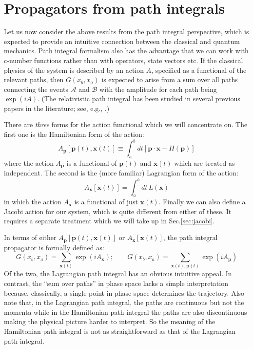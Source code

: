 \documentclass{article}
\begin{document}
 
 \section{Propagators from path integrals}\label{sec:prfrpi}
 
 Let us now consider the above results from the path integral perspective, which is expected to provide an intuitive connection between the classical and quantum mechanics. Path integral formalism also has the advantage that we can work with c-number functions rather than with operators, state vectors etc.  If the classical physics of the system is described by an action $A$, specified as a functional of the relevant paths, then $G(x_b, x_a)$ is expected to arise  from a sum over all paths connecting the events $\mathcal{A}$ and $\mathcal{B}$ with the amplitude for each path being $\exp(iA)$. (The relativistic path integral has been studied in several previous papers in the literature; see, e.g., \cite{A,A1,A2,B,B2,B9,E,H,I}.)
 
 There are \textit{three}  forms for the action functional which we will concentrate on. The first one is the Hamiltonian form of the action:
 \begin{equation}
  A_{\bm{p}}[\bm{p}(t), \bm{x}(t)] \equiv \int_a^b dt [\bm{p \cdot \dot x} - H (\bm{p})]
 \end{equation} 
 where the action $A_{\bm{p}}$ is a functional of  $\bm{p}(t)$ and $\bm{x}(t)$ which are treated as independent. The second is the (more familiar) Lagrangian form of the action:
 \begin{equation}
A_{\bm{x}}[\bm{x}(t)] = \int_a^b dt \, L(\dot{\bm{x}})
\end{equation} 
 in which the action $A_{\bm{x}}$ is a functional of just $\bm{x}(t)$. Finally we can also define a Jacobi action for our system, which is quite different from either of these. It requires a separate treatment which we will take up in Sec.\ref{sec:jacobi}.
  
  In terms of either $A_{\bm{p}}[\bm{p}(t), \bm{x}(t)]$ or $A_{\bm{x}}[\bm{x}(t)]$,  the path integral propagator is formally defined as: 
 \begin{equation} 
G(x_b, x_a) = \sum_{\bm{x}(t)} \exp (iA_{\bm{x}});\qquad  G(x_b, x_a)= \sum_{\bm{x}(t), \bm{p}(t) }\exp(i A_{\bm{p}} )
 \end{equation}
 Of the two, the Lagrangian path integral has an obvious intuitive appeal.  In contrast, the ``sum over paths'' in phase space lacks a simple interpretation  because, classically, a single point in phase space determines the trajectory. Also note that, in the Lagrangian path integral, the paths are continuous but not the momenta while in the Hamiltonian path integral the paths are also discontinuous making the physical picture harder to interpret. So the meaning of the Hamiltonian path integral is not as straightforward as that of the Lagrangian path integral.
 
\end{document}
